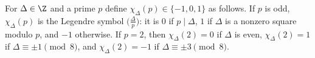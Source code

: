 For $\Delta\in\Z$ and a prime $p$ define $\chi_\Delta(p)\in\{-1,0,1\}$ as follows. If $p$ is odd, $\chi_\Delta(p)$ is the Legendre symbol
$\bigl(\frac\Delta p\bigr)$: it is $0$ if $p\mid\Delta$, $1$ if $\Delta$ is a nonzero square modulo $p$, and $-1$ otherwise. If $p=2$, then
$\chi_\Delta(2)=0$ if $\Delta$ is even, $\chi_\Delta(2)=1$ if $\Delta\equiv\pm1\pmod 8$, and $\chi_\Delta(2)=-1$ if $\Delta\equiv\pm3\pmod 8$.
